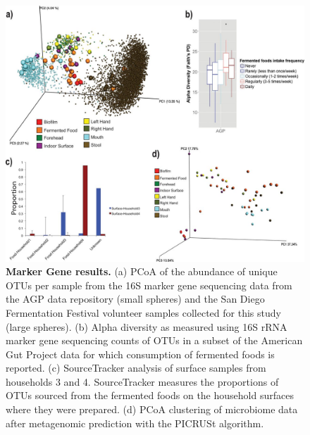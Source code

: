 \begin{figure}[htbp]
\includegraphics[width=\columnwidth]{chapter_48_hours_figures/F2.jpg}
\caption[Marker Gene results]{\textbf{Marker Gene results.} (a) PCoA of the abundance of unique OTUs per sample from the 16S marker gene sequencing data from the AGP data repository (small spheres) and the San Diego Fermentation Festival volunteer samples collected for this study (large spheres). (b) Alpha diversity as measured using 16S rRNA marker gene sequencing counts of OTUs in a subset of the American Gut Project data for which consumption of fermented foods is reported. (c) SourceTracker analysis of surface samples from households 3 and 4. SourceTracker measures the proportions of OTUs sourced from the fermented foods on the household surfaces where they were prepared. (d) PCoA clustering of microbiome data after metagenomic prediction with the PICRUSt algorithm.}
\label{rrfigure2}
\end{figure}

